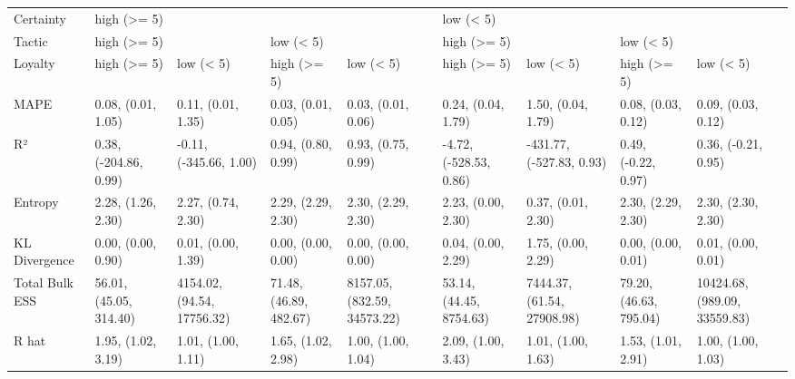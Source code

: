 \begin{tabular}{lllllllll}
\toprule
Certainty & \multicolumn{4}{l}{high (>= 5)} & \multicolumn{4}{l}{low (< 5)} \\
Tactic & \multicolumn{2}{l}{high (>= 5)} & \multicolumn{2}{l}{low (< 5)} & \multicolumn{2}{l}{high (>= 5)} & \multicolumn{2}{l}{low (< 5)} \\
Loyalty &             high (>= 5) &                   low (< 5) &             high (>= 5) &                    low (< 5) &              high (>= 5) &                   low (< 5) &             high (>= 5) &                     low (< 5) \\
\midrule
MAPE           &      0.08, (0.01, 1.05) &          0.11, (0.01, 1.35) &      0.03, (0.01, 0.05) &           0.03, (0.01, 0.06) &       0.24, (0.04, 1.79) &          1.50, (0.04, 1.79) &      0.08, (0.03, 0.12) &            0.09, (0.03, 0.12) \\
R²             &   0.38, (-204.86, 0.99) &      -0.11, (-345.66, 1.00) &      0.94, (0.80, 0.99) &           0.93, (0.75, 0.99) &   -4.72, (-528.53, 0.86) &    -431.77, (-527.83, 0.93) &     0.49, (-0.22, 0.97) &           0.36, (-0.21, 0.95) \\
Entropy        &      2.28, (1.26, 2.30) &          2.27, (0.74, 2.30) &      2.29, (2.29, 2.30) &           2.30, (2.29, 2.30) &       2.23, (0.00, 2.30) &          0.37, (0.01, 2.30) &      2.30, (2.29, 2.30) &            2.30, (2.30, 2.30) \\
KL Divergence  &      0.00, (0.00, 0.90) &          0.01, (0.00, 1.39) &      0.00, (0.00, 0.00) &           0.00, (0.00, 0.00) &       0.04, (0.00, 2.29) &          1.75, (0.00, 2.29) &      0.00, (0.00, 0.01) &            0.01, (0.00, 0.01) \\
Total Bulk ESS &  56.01, (45.05, 314.40) &  4154.02, (94.54, 17756.32) &  71.48, (46.89, 482.67) &  8157.05, (832.59, 34573.22) &  53.14, (44.45, 8754.63) &  7444.37, (61.54, 27908.98) &  79.20, (46.63, 795.04) &  10424.68, (989.09, 33559.83) \\
R hat          &      1.95, (1.02, 3.19) &          1.01, (1.00, 1.11) &      1.65, (1.02, 2.98) &           1.00, (1.00, 1.04) &       2.09, (1.00, 3.43) &          1.01, (1.00, 1.63) &      1.53, (1.01, 2.91) &            1.00, (1.00, 1.03) \\
\bottomrule
\end{tabular}
